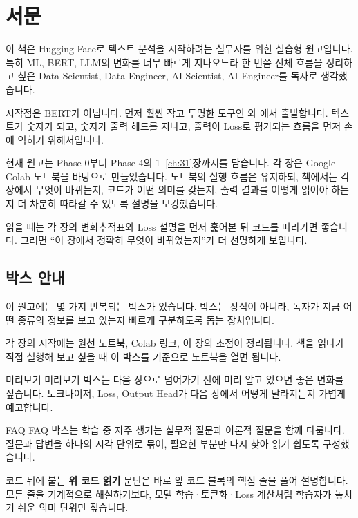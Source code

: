 \chapter*{서문}

이 책은 Hugging Face로 텍스트 분석을 시작하려는 실무자를 위한 실습형 원고입니다. 특히 ML, BERT, LLM의 변화를 너무 빠르게 지나오느라 한 번쯤 전체 흐름을 정리하고 싶은 Data Scientist, Data Engineer, AI Scientist, AI Engineer를 독자로 생각했습니다.

시작점은 BERT가 아닙니다. 먼저 훨씬 작고 투명한 도구인 와 에서 출발합니다. 텍스트가 숫자가 되고, 숫자가 출력 헤드를 지나고, 출력이 Loss로 평가되는 흐름을 먼저 손에 익히기 위해서입니다.

현재 원고는 Phase 0부터 Phase 4의 1--\ref{ch:31}장까지를 담습니다. 각 장은 Google Colab 노트북을 바탕으로 만들었습니다. 노트북의 실행 흐름은 유지하되, 책에서는 각 장에서 무엇이 바뀌는지, 코드가 어떤 의미를 갖는지, 출력 결과를 어떻게 읽어야 하는지 더 차분히 따라갈 수 있도록 설명을 보강했습니다.

읽을 때는 각 장의 변화추적표와 Loss 설명을 먼저 훑어본 뒤 코드를 따라가면 좋습니다. 그러면 “이 장에서 정확히 무엇이 바뀌었는지”가 더 선명하게 보입니다.

\section*{박스 안내}

이 원고에는 몇 가지 반복되는 박스가 있습니다. 박스는 장식이 아니라, 독자가 지금 어떤 종류의 정보를 보고 있는지 빠르게 구분하도록 돕는 장치입니다.

\begin{noteBox}
각 장의 시작에는 원천 노트북, Colab 링크, 이 장의 초점이 정리됩니다. 책을 읽다가 직접 실행해 보고 싶을 때 이 박스를 기준으로 노트북을 열면 됩니다.
\end{noteBox}

\begin{previewBox}{미리보기}
미리보기 박스는 다음 장으로 넘어가기 전에 미리 알고 있으면 좋은 변화를 짚습니다. 토크나이저, Loss, Output Head가 다음 장에서 어떻게 달라지는지 가볍게 예고합니다.
\end{previewBox}

\begin{faqBox}{FAQ}
FAQ 박스는 학습 중 자주 생기는 실무적 질문과 이론적 질문을 함께 다룹니다. 질문과 답변을 하나의 시각 단위로 묶어, 필요한 부분만 다시 찾아 읽기 쉽도록 구성했습니다.
\end{faqBox}

코드 뒤에 붙는 \textbf{위 코드 읽기} 문단은 바로 앞 코드 블록의 핵심 줄을 풀어 설명합니다. 모든 줄을 기계적으로 해설하기보다, 모델 학습·토큰화·Loss 계산처럼 학습자가 놓치기 쉬운 의미 단위만 짚습니다.

\cleardoublepage
